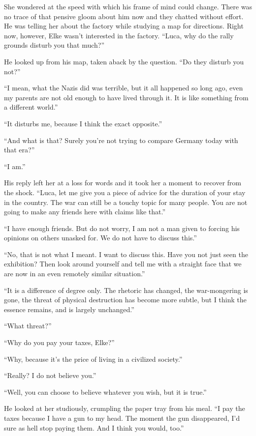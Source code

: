 She wondered at the speed with which his frame of mind could change. There was no trace of that pensive gloom about him now and they chatted without effort. He was telling her about the factory while studying a map for directions. Right now, however, Elke wasn't interested in the factory. ``Luca, why do the rally grounds disturb you that much?''

He looked up from his map, taken aback by the question. ``Do they disturb you not?''

``I mean, what the Nazis did was terrible, but it all happened so long ago, even my parents are not old enough to have lived through it. It is like something from a different world.''

``It disturbs me, because I think the exact opposite.''

``And what is that? Surely you're not trying to compare Germany today with that era?''

``I am.''

His reply left her at a loss for words and it took her a moment to recover from the shock. ``Luca, let me give you a piece of advice for the duration of your stay in the country. The war can still be a touchy topic for many people. You are not going to make any friends here with claims like that.''

``I have enough friends. But do not worry, I am not a man given to forcing his opinions on others unasked for. We do not have to discuss this.''

``No, that is not what I meant. I want to discuss this. Have you not just seen the exhibition? Then look around yourself and tell me with a straight face that we are now in an even remotely similar situation.''

``It is a difference of degree only. The rhetoric has changed, the war-mongering is gone, the threat of physical destruction has become more subtle, but I think the essence remains, and is largely unchanged.''

``What threat?''

``Why do you pay your taxes, Elke?''

``Why, because it's the price of living in a civilized society.''

``Really? I do not believe you.''

``Well, you can choose to believe whatever you wish, but it is true.''

He looked at her studiously, crumpling the paper tray from his meal. ``I pay the taxes because I have a gun to my head. The moment the gun disappeared, I'd sure as hell stop paying them. And I think you would, too.''

